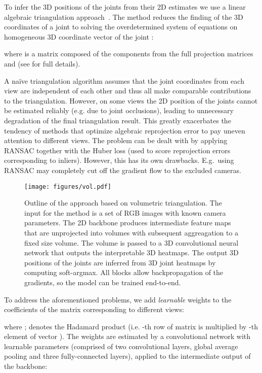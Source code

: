 \documentclass[10pt,twocolumn,letterpaper]{article}
\begin{document}
To infer the 3D positions of the joints from their 2D estimates  we use a linear algebraic triangulation approach~\cite{hartley2003multiple}. The method reduces the finding of the 3D coordinates of a joint  to solving the overdetermined system of equations on homogeneous 3D coordinate vector of the joint : 

where  is a matrix composed of the components from the full projection matrices and  (see \cite{hartley2003multiple} for full details). 

A na\"ive triangulation algorithm assumes that the joint coordinates from each view are independent of each other and thus all make comparable contributions to the triangulation. However, on some views the 2D position of the joints cannot be estimated reliably (e.g. due to joint occlusions), leading to unnecessary degradation of the final triangulation result. This greatly exacerbates the tendency of methods that optimize algebraic reprojection error to pay uneven attention to different views. The problem can be dealt with by applying RANSAC together with the Huber loss (used to score reprojection errors corresponding to inliers). However, this has its own drawbacks. E.g.\ using RANSAC may completely cut off the gradient flow to the excluded cameras.

\begin{figure*}
    \centering
    \texttt{[image: figures/vol.pdf]}
    \caption{Outline of the approach based on volumetric triangulation. The input for the method is a set of RGB images with known camera parameters. The 2D backbone produces intermediate feature maps that are unprojected into volumes with subsequent aggreagation to a fixed size volume. The volume is passed to a 3D convolutional neural network that outputs the interpretable 3D heatmaps. The output 3D positions of the joints are inferred from 3D joint heatmaps by computing soft-argmax. All blocks allow backpropagation of the gradients, so the model can be trained end-to-end.}
    \label{fig:vol}
\end{figure*}

To address the aforementioned problems, we add \textit{learnable} weights  to the coefficients of the matrix corresponding to different views:

where ;  denotes the Hadamard product (i.e. -th row of matrix  is multiplied by -th element of vector ). The weights  are estimated by a convolutional network  with learnable parameters  (comprised of two convolutional layers, global average pooling and three fully-connected layers), applied to the intermediate output of the backbone:
\end{document}
